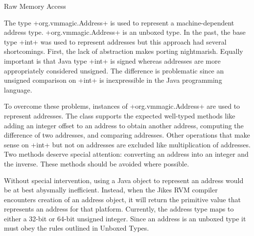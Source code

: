 \begin{section}{Raw Memory Access}
\label{sec:rawmemoryaccess}

The type \spverb+org.vmmagic.Address+ is used to represent a machine-dependent address type. \spverb+org.vmmagic.Address+ is an unboxed type. In the past, the base type \spverb+int+ was used to represent addresses but this approach had several shortcomings. First, the lack of abstraction makes porting nightmarish. Equally important is that Java type \spverb+int+ is signed whereas addresses are more appropriately considered unsigned. The difference is problematic since an unsigned comparison on \spverb+int+ is inexpressible in the Java programming language.

To overcome these problems, instances of \spverb+org.vmmagic.Address+ are used to represent addresses. The class supports the expected well-typed methods like adding an integer offset to an address to obtain another address, computing the difference of two addresses, and comparing addresses. Other operations that make sense on \spverb+int+ but not on addresses are excluded like multiplication of addresses. Two methods deserve special attention: converting an address into an integer and the inverse. These methods should be avoided where possible.

Without special intervention, using a Java object to represent an address would be at best abysmally inefficient. Instead, when the Jikes RVM compiler encounters creation of an address object, it will return the primitive value that represents an address for that platform. Currently, the address type maps to either a 32-bit or 64-bit unsigned integer. Since an address is an unboxed type it must obey the rules outlined in Unboxed Types.

\end{section}